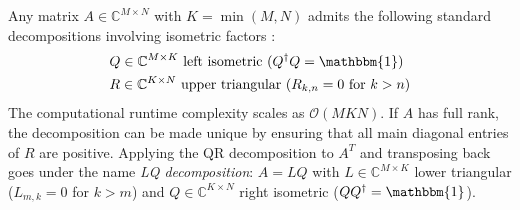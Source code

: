 \noindent Any matrix $A \in \mathbb{C}^{M \times N}$ with $K = \min(M, N)$ admits the following standard decompositions involving isometric factors \cite{horn2012matrix}: \\

\noindent {} \vspace{-0.75em} 
\begin{align}
\begin{split}
	& Q \in \mathbb{C}^{M \times K} \text{ left isometric } (Q^{\dagger}Q = \mathbbm{1}) \\
	& R \in \mathbb{C}^{K \times N} \text{ upper triangular } (R_{k,n} = 0 \text{ for } k > n) 
\end{split}
\end{align}
The computational runtime complexity scales as $\mathcal{O}(MKN)$. If $A$ has full rank, the decomposition can be made unique by ensuring that all main diagonal entries of $R$ are positive. Applying the QR decomposition to $A^T$ and transposing back goes under the name \textit{LQ decomposition}: $A = LQ$ with $L \in \mathbb{C}^{M \times K}$ lower triangular ($L_{m,k} = 0$ for $k > m$) and $Q \in \mathbb{C}^{K \times N}$ right isometric ($QQ^{\dagger} = \mathbbm{1}$). \\

